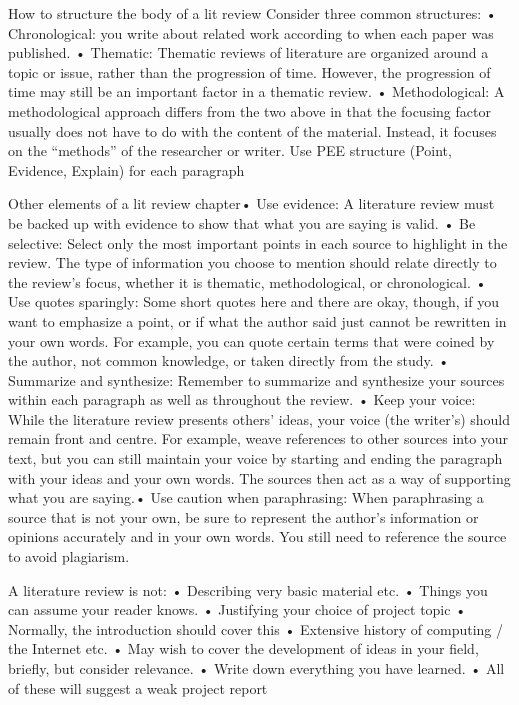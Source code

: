{    How to structure the body of a lit review
    Consider three common structures:
    • Chronological: you write about related work according to when each paper was published.
    • Thematic: Thematic reviews of literature are organized around a topic or issue, rather than the progression of time. However,
    the progression of time may still be an important factor in a thematic review.
    • Methodological: A methodological approach differs from the two above in that the focusing factor usually does not have to do with the content of the material.
    Instead, it focuses on the “methods” of the researcher or writer. Use PEE structure (Point, Evidence, Explain) for each paragraph

    Other elements of a lit review chapter• Use evidence: A literature review must be backed up with evidence to show that what you are saying is valid.
    • Be selective: Select only the most important points in each source to highlight in the review. The type of information you choose to mention should relate
    directly to the review's focus, whether it is thematic, methodological, or chronological.
    • Use quotes sparingly: Some short quotes here and there are okay, though, if you want to emphasize a point, or if what the author said just cannot be rewritten in your own words.
    For example, you can quote certain terms that were coined by the author, not common knowledge, or taken directly from the study.
    • Summarize and synthesize: Remember to summarize and synthesize your sources within
    each paragraph as well as throughout the review.
    • Keep your voice: While the literature review presents others' ideas, your voice (the writer's) should remain front and centre.
    For example, weave references to other sources into your text, but you can still maintain your voice by starting and ending the paragraph with your ideas and
    your own words. The sources then act as a way of supporting what you are saying.• Use caution when paraphrasing: When paraphrasing a source that is not your own, be sure to
    represent the author's information or opinions accurately and in your own words. You still need to reference the source to avoid plagiarism.

    A literature review is not:
    • Describing very basic material etc.
    • Things you can assume your reader knows.
    • Justifying your choice of project topic
    • Normally, the introduction should cover this
    • Extensive history of computing / the Internet etc.
    • May wish to cover the development of ideas in your field, briefly, but consider relevance.
    • Write down everything you have learned.
    • All of these will suggest a weak project report

}
